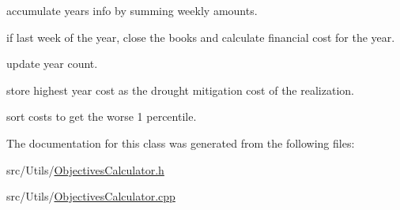 accumulate year\textquotesingle{}s info by summing weekly amounts.

if last week of the year, close the books and calculate financial cost for the year.

update year count.

store highest year cost as the drought mitigation cost of the realization.

sort costs to get the worse 1 percentile. 

The documentation for this class was generated from the following files\+:\begin{DoxyCompactItemize}
\item 
src/\+Utils/\mbox{\hyperlink{ObjectivesCalculator_8h}{Objectives\+Calculator.\+h}}\item 
src/\+Utils/\mbox{\hyperlink{ObjectivesCalculator_8cpp}{Objectives\+Calculator.\+cpp}}\end{DoxyCompactItemize}
